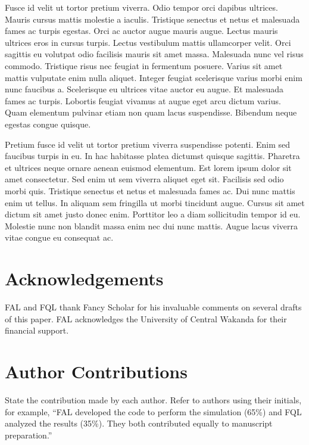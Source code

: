\documentclass{ledger}
\begin{document}
Fusce id velit ut tortor pretium viverra. Odio tempor orci dapibus ultrices. Mauris cursus mattis molestie a iaculis. Tristique senectus et netus et malesuada fames ac turpis egestas. Orci ac auctor augue mauris augue. Lectus mauris ultrices eros in cursus turpis. Lectus vestibulum mattis ullamcorper velit. Orci sagittis eu volutpat odio facilisis mauris sit amet massa. Malesuada nunc vel risus commodo. Tristique risus nec feugiat in fermentum posuere. Varius sit amet mattis vulputate enim nulla aliquet. Integer feugiat scelerisque varius morbi enim nunc faucibus a. Scelerisque eu ultrices vitae auctor eu augue. Et malesuada fames ac turpis. Lobortis feugiat vivamus at augue eget arcu dictum varius. Quam elementum pulvinar etiam non quam lacus suspendisse. Bibendum neque egestas congue quisque.

Pretium fusce id velit ut tortor pretium viverra suspendisse potenti. Enim sed faucibus turpis in eu. In hac habitasse platea dictumst quisque sagittis. Pharetra et ultrices neque ornare aenean euismod elementum. Est lorem ipsum dolor sit amet consectetur. Sed enim ut sem viverra aliquet eget sit. Facilisis sed odio morbi quis. Tristique senectus et netus et malesuada fames ac. Dui nunc mattis enim ut tellus. In aliquam sem fringilla ut morbi tincidunt augue. Cursus sit amet dictum sit amet justo donec enim. Porttitor leo a diam sollicitudin tempor id eu. Molestie nunc non blandit massa enim nec dui nunc mattis. Augue lacus viverra vitae congue eu consequat ac.


\ledgernotes

\section*{Acknowledgements} 

FAL and FQL thank Fancy Scholar for his 
invaluable comments on several drafts of this paper. 
FAL acknowledges the University of Central Wakanda for their financial support.

\section*{Author Contributions}

State the contribution made by each author.  Refer to authors using their initials, for example, ``FAL developed the code to perform the simulation (65\%) and FQL analyzed the results (35\%).  They both contributed equally to manuscript preparation.''
\end{document}
